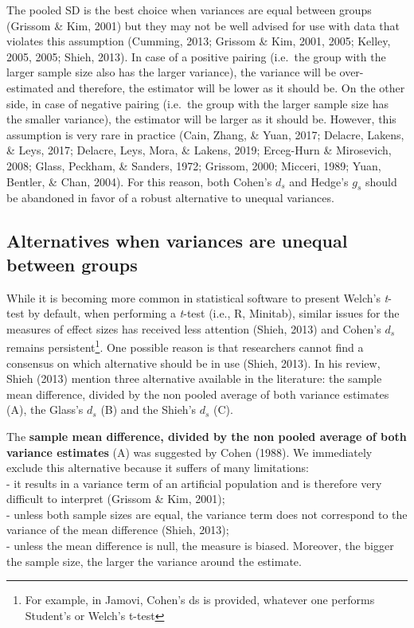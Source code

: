 \documentclass[man]{apa6}
\let\rmarkdownfootnote\footnote%
\def\footnote{\protect\rmarkdownfootnote}
\begin{document}
The pooled SD is the best choice when variances are equal between groups (Grissom \& Kim, 2001) but they may not be well advised for use with data that violates this assumption (Cumming, 2013; Grissom \& Kim, 2001, 2005; Kelley, 2005, 2005; Shieh, 2013). In case of a positive pairing (i.e.~the group with the larger sample size also has the larger variance), the variance will be over-estimated and therefore, the estimator will be lower as it should be. On the other side, in case of negative pairing (i.e.~the group with the larger sample size has the smaller variance), the estimator will be larger as it should be. However, this assumption is very rare in practice (Cain, Zhang, \& Yuan, 2017; Delacre, Lakens, \& Leys, 2017; Delacre, Leys, Mora, \& Lakens, 2019; Erceg-Hurn \& Mirosevich, 2008; Glass, Peckham, \& Sanders, 1972; Grissom, 2000; Micceri, 1989; Yuan, Bentler, \& Chan, 2004). For this reason, both Cohen's \(d_s\) and Hedge's \(g_s\) should be abandoned in favor of a robust alternative to unequal variances.

\hypertarget{alternatives-when-variances-are-unequal-between-groups}{%
\subsection{Alternatives when variances are unequal between groups}\label{alternatives-when-variances-are-unequal-between-groups}}

While it is becoming more common in statistical software to present Welch's \emph{t}-test by default, when performing a \emph{t}-test (i.e., R, Minitab), similar issues for the measures of effect sizes has received less attention (Shieh, 2013) and Cohen's \(d_s\) remains persistent\footnote{For example, in Jamovi, Cohen's ds is provided, whatever one performs Student's or Welch's t-test}. One possible reason is that researchers cannot find a consensus on which alternative should be in use (Shieh, 2013). In his review, Shieh (2013) mention three alternative available in the literature: the sample mean difference, divided by the non pooled average of both variance estimates (A), the Glass's \(d_s\) (B) and the Shieh's \(d_s\) (C).

The \textbf{sample mean difference, divided by the non pooled average of both variance estimates} (A) was suggested by Cohen (1988). We immediately exclude this alternative because it suffers of many limitations:\\
- it results in a variance term of an artificial population and is therefore very difficult to interpret (Grissom \& Kim, 2001);\\
- unless both sample sizes are equal, the variance term does not correspond to the variance of the mean difference (Shieh, 2013);\\
- unless the mean difference is null, the measure is biased. Moreover, the bigger the sample size, the larger the variance around the estimate.
\end{document}
